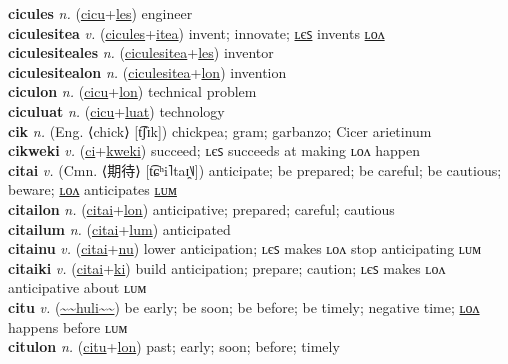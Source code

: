 \textbf{cicules} \textit{n.} (\hyperref[cicu]{cicu}+\hyperref[les]{les})
engineer \label{cicules} \\
\textbf{ciculesitea} \textit{v.} (\hyperref[cicules]{cicules}+\hyperref[itea]{itea})
invent; innovate; \hyperref[ciculesiteales]{ʟєꜱ} invents \hyperref[ciculesitealon]{ʟᴏᴧ} \label{ciculesitea} \\
\textbf{ciculesiteales} \textit{n.} (\hyperref[ciculesitea]{ciculesitea}+\hyperref[les]{les})
inventor \label{ciculesiteales} \\
\textbf{ciculesitealon} \textit{n.} (\hyperref[ciculesitea]{ciculesitea}+\hyperref[lon]{lon})
invention \label{ciculesitealon} \\
\textbf{ciculon} \textit{n.} (\hyperref[cicu]{cicu}+\hyperref[lon]{lon})
technical problem \label{ciculon} \\
\textbf{ciculuat} \textit{n.} (\hyperref[cicu]{cicu}+\hyperref[luat]{luat})
technology \label{ciculuat} \\
\textbf{cik} \textit{n.} (Eng. ⟨chick⟩ [t͡ʃɪk])
chickpea; gram; garbanzo; Cicer arietinum \label{cik} \\
\textbf{cikweki} \textit{v.} (\hyperref[ci]{ci}+\hyperref[kweki]{kweki})
succeed; ʟєꜱ succeeds at making ʟᴏᴧ happen \label{cikweki} \\
\textbf{citai} \textit{v.} (Cmn. ⟨期待⟩ [t͡ɕʰi˥taɪ̯˥˩])
anticipate; be prepared; be careful; be cautious; beware; \hyperref[citailon]{ʟᴏᴧ} anticipates \hyperref[citailum]{ʟᴜᴍ} \label{citai} \\
\textbf{citailon} \textit{n.} (\hyperref[citai]{citai}+\hyperref[lon]{lon})
anticipative; prepared; careful; cautious \label{citailon} \\
\textbf{citailum} \textit{n.} (\hyperref[citai]{citai}+\hyperref[lum]{lum})
anticipated \label{citailum} \\
\textbf{citainu} \textit{v.} (\hyperref[citai]{citai}+\hyperref[nu]{nu})
lower anticipation; ʟєꜱ makes ʟᴏᴧ stop anticipating ʟᴜᴍ \label{citainu} \\
\textbf{citaiki} \textit{v.} (\hyperref[citai]{citai}+\hyperref[ki]{ki})
build anticipation; prepare; caution; ʟєꜱ makes ʟᴏᴧ anticipative about ʟᴜᴍ \label{citaiki} \\
\textbf{citu} \textit{v.} (\hyperref[huli]{\~{}\~{}huli\~{}\~{}})
be early; be soon; be before; be timely; negative time; \hyperref[citulon]{ʟᴏᴧ} happens before ʟᴜᴍ \label{citu} \\
\textbf{citulon} \textit{n.} (\hyperref[citu]{citu}+\hyperref[lon]{lon})
past; early; soon; before; timely \label{citulon} \\
